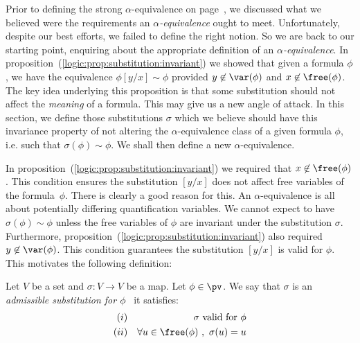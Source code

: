 Prior to defining the strong $\alpha$-equivalence on
page~\pageref{logic:def:strong:sub:congruence}, we discussed what we
believed were the requirements an {\em $\alpha$-equivalence} ought
to meet. Unfortunately, despite our best efforts, we failed to
define the right notion. So we are back to our starting point,
enquiring about the appropriate definition of an 
{\em $\alpha$-equivalence}. In 
proposition~(\ref{logic:prop:substitution:invariant}) we showed that
given a formula $\phi$, we have the equivalence $\phi[y/x]\sim\phi$
provided $y\not\in\var(\phi)$ and $x\not\in\free(\phi)$. The key
idea underlying this proposition is that some substitution should
not affect the {\em meaning} of a formula. This may give us a new
angle of attack. In this section, we define those substitutions
$\sigma$ which we believe should have this invariance property of
not altering the $\alpha$-equivalence class of a given formula $\phi$, i.e.
such that $\sigma(\phi)\sim\phi$. We shall then define a new 
$\alpha$-equivalence.

In proposition~(\ref{logic:prop:substitution:invariant}) we required
that $x\not\in\free(\phi)$. This condition ensures the substitution
$[y/x]$ does not affect free variables of the formula~$\phi$. There
is clearly a good reason for this. An $\alpha$-equivalence is all
about potentially differing quantification variables. We cannot
expect to have $\sigma(\phi)\sim\phi$ unless the free variables of
$\phi$ are invariant under the substitution $\sigma$. Furthermore,
proposition~(\ref{logic:prop:substitution:invariant}) also required
$y\not\in\var(\phi)$. This condition guarantees the substitution
$[y/x]$ is valid for $\phi$. This motivates the following
definition:

\begin{defin}\label{logic:def:admissible:substitution}
Let $V$ be a set and $\sigma:V\to V$ be a map. Let $\phi\in\pv$. We
say that $\sigma$ is an {\em admissible substitution for $\phi$}
\ifand\ it satisfies:
    \begin{eqnarray*}
    (i)&&\mbox{$\sigma$ valid for $\phi$}\\
    (ii)&&\forall u\in\free(\phi)\ ,\ \sigma(u)=u
    \end{eqnarray*}
\end{defin}

